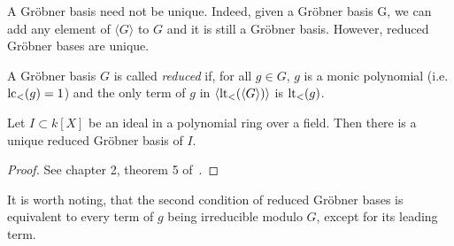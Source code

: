A Gröbner basis need not be unique. Indeed, given a Gröbner basis G, we can add any element of $\langle G \rangle$ to $G$ and it is still a Gröbner basis. However, reduced Gröbner bases are unique.

\begin{definition}
  A Gröbner basis $G$ is called \textit{reduced} if, for all $g \in G$, $g$ is a monic polynomial (i.e. $\operatorname{lc}_{<}(g) = 1$) and the only term of $g$ in $\langle \operatorname{lt}_{<}(\langle G \rangle) \rangle$ is $\operatorname{lt}_{<}(g)$.
\end{definition}
\begin{theorem}
  Let $I \subset k[X]$ be an ideal in a polynomial ring over a field. Then there is a unique reduced Gröbner basis of $I$.
\end{theorem}
\begin{proof}
  See chapter 2, theorem 5 of~\cite{IVA}.
\end{proof}


It is worth noting, that the second condition of reduced Gröbner bases is equivalent to every term of $g$ being irreducible modulo $G$, except for its leading term.
